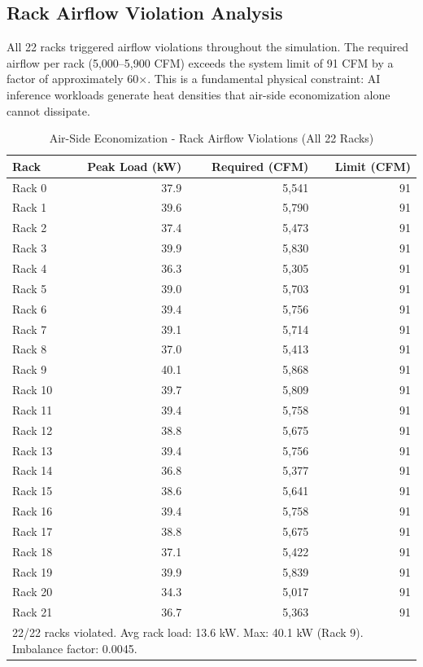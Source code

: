 ﻿\documentclass[12pt,a4paper]{report}
\begin{document}
\subsection{Rack Airflow Violation Analysis}

All 22 racks triggered airflow violations throughout the simulation. The required airflow
per rack (5{,}000--5{,}900 CFM) exceeds the system limit of 91 CFM by a factor of
approximately 60$\times$. This is a fundamental physical constraint: AI inference workloads
generate heat densities that air-side economization alone cannot dissipate.

\begin{table}[H]
\centering
\caption{Air-Side Economization - Rack Airflow Violations (All 22 Racks)}
\label{tab:air_airflow}
\renewcommand{\arraystretch}{1.25}
\begin{tabular}{lrrr}
\toprule
\textbf{Rack} & \textbf{Peak Load (kW)} & \textbf{Required (CFM)} & \textbf{Limit (CFM)} \\
\midrule
Rack 0  & 37.9 & 5{,}541 & 91 \\
Rack 1  & 39.6 & 5{,}790 & 91 \\
Rack 2  & 37.4 & 5{,}473 & 91 \\
Rack 3  & 39.9 & 5{,}830 & 91 \\
Rack 4  & 36.3 & 5{,}305 & 91 \\
Rack 5  & 39.0 & 5{,}703 & 91 \\
Rack 6  & 39.4 & 5{,}756 & 91 \\
Rack 7  & 39.1 & 5{,}714 & 91 \\
Rack 8  & 37.0 & 5{,}413 & 91 \\
Rack 9  & 40.1 & 5{,}868 & 91 \\
Rack 10 & 39.7 & 5{,}809 & 91 \\
Rack 11 & 39.4 & 5{,}758 & 91 \\
Rack 12 & 38.8 & 5{,}675 & 91 \\
Rack 13 & 39.4 & 5{,}756 & 91 \\
Rack 14 & 36.8 & 5{,}377 & 91 \\
Rack 15 & 38.6 & 5{,}641 & 91 \\
Rack 16 & 39.4 & 5{,}758 & 91 \\
Rack 17 & 38.8 & 5{,}675 & 91 \\
Rack 18 & 37.1 & 5{,}422 & 91 \\
Rack 19 & 39.9 & 5{,}839 & 91 \\
Rack 20 & 34.3 & 5{,}017 & 91 \\
Rack 21 & 36.7 & 5{,}363 & 91 \\
\midrule
\multicolumn{4}{l}{\small 22/22 racks violated. Avg rack load: 13.6 kW. Max: 40.1 kW (Rack 9). Imbalance factor: 0.0045.}\\
\end{tabular}
\end{table}
\end{document}
